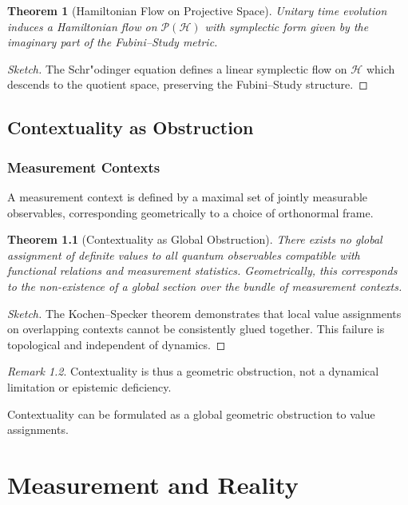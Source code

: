 \documentclass[12pt]{book}
\theoremstyle{plain}
\newtheorem{theorem}{Theorem}[chapter]
\theoremstyle{definition}
\theoremstyle{remark}
\newtheorem{remark}[theorem]{Remark}
\begin{document}
\begin{theorem}[Hamiltonian Flow on Projective Space]
Unitary time evolution induces a Hamiltonian flow on $\mathcal{P}(\mathcal{H})$ with symplectic form given by the imaginary part of the Fubini--Study metric.
\end{theorem}

\begin{proof}[Sketch]
The Schr"odinger equation defines a linear symplectic flow on $\mathcal{H}$ which descends to the quotient space, preserving the Fubini--Study structure.
\end{proof}

\chapter{Contextuality as Obstruction}

\section{Measurement Contexts}
A measurement context is defined by a maximal set of jointly measurable observables, corresponding geometrically to a choice of orthonormal frame.

\begin{theorem}[Contextuality as Global Obstruction]
There exists no global assignment of definite values to all quantum observables compatible with functional relations and measurement statistics. Geometrically, this corresponds to the non-existence of a global section over the bundle of measurement contexts.
\end{theorem}

\begin{proof}[Sketch]
The Kochen--Specker theorem demonstrates that local value assignments on overlapping contexts cannot be consistently glued together. This failure is topological and independent of dynamics.
\end{proof}

\begin{remark}
Contextuality is thus a geometric obstruction, not a dynamical limitation or epistemic deficiency.
\end{remark}
Contextuality can be formulated as a global geometric obstruction to value assignments.

\part{Measurement and Reality}
\end{document}
